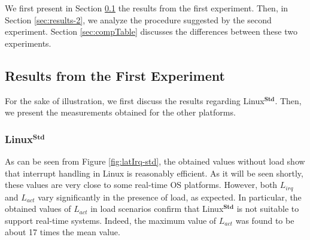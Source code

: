 \documentclass{acm_proc_article-sp}
\begin{document}
We first present in Section \ref{sec:results-1} the results from the first
experiment.  Then, in Section \ref{sec:results-2}, we analyze the procedure
suggested by the second experiment. Section \ref{sec:compTable} discusses the
differences between these two experiments.
\newline

\subsection{Results from the First Experiment}
\label{sec:results-1}

For the sake of illustration, we first discuss the results regarding
Linux$^\mathbf{Std}$.  Then, we present the measurements obtained for the other
platforms.

\subsubsection{Linux$^\mathbf{Std}$}

As can be seen from Figure \ref{fig:latIrq-std}, the obtained values without load
show that interrupt handling in Linux is reasonably efficient. As it will be seen
shortly, these values are very close to some real-time OS platforms.  However, both
$L_{irq}$ and $L_{act}$ vary significantly in the presence of load, as
expected.  In particular, the obtained values of $L_{act}$ in load scenarios
confirm that Linux$^\mathbf{Std}$ is not suitable to support real-time systems.
Indeed, the maximum value of $L_{act}$ was found to be about 17 times the mean value.
\end{document}
